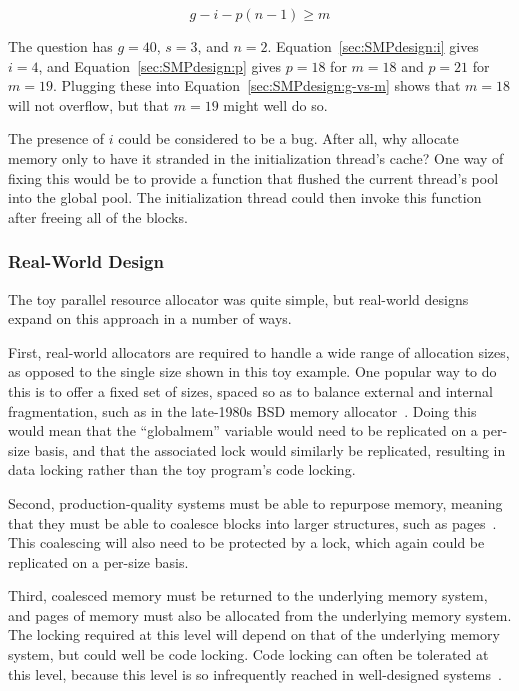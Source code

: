 {{	\begin{equation}
		g - i - p(n - 1) \ge m
	\label{sec:SMPdesign:g-vs-m}
	\end{equation}

	The question has $g=40$, $s=3$, and $n=2$.
	Equation~\ref{sec:SMPdesign:i} gives $i=4$, and
	Equation~\ref{sec:SMPdesign:p} gives $p=18$ for $m=18$
	and $p=21$ for $m=19$.
	Plugging these into Equation~\ref{sec:SMPdesign:g-vs-m}
	shows that $m=18$ will not overflow, but that $m=19$ might
	well do so.

	The presence of $i$ could be considered to be a bug.
	After all, why allocate memory only to have it stranded in
	the initialization thread's cache?
	One way of fixing this would be to provide a 
	function that flushed the current thread's pool into the
	global pool.
	The initialization thread could then invoke this function
	after freeing all of the blocks.
}\QuickQuizEndE
}

\subsubsection{Real-World Design}

The toy parallel resource allocator was quite simple, but real-world
designs expand on this approach in a number of ways.

First, real-world allocators are required to handle a wide range
of allocation sizes, as opposed to the single size shown in this
toy example.
One popular way to do this is to offer a fixed set of sizes, spaced
so as to balance external and internal fragmentation, such as in
the late-1980s BSD memory allocator~\cite{McKusick88}.
Doing this would mean that the ``globalmem'' variable would need
to be replicated on a per-size basis, and that the associated
lock would similarly be replicated, resulting in data locking
rather than the toy program's code locking.

Second, production-quality systems must be able to repurpose memory,
meaning that they must be able to coalesce blocks into larger structures,
such as pages~\cite{McKenney93}.
This coalescing will also need to be protected by a lock, which again
could be replicated on a per-size basis.

Third, coalesced memory must be returned to the underlying memory
system, and pages of memory must also be allocated from the underlying
memory system.
The locking required at this level will depend on that of the underlying
memory system, but could well be code locking.
Code locking can often be tolerated at this level, because this
level is so infrequently reached in well-designed systems~\cite{McKenney01e}.

